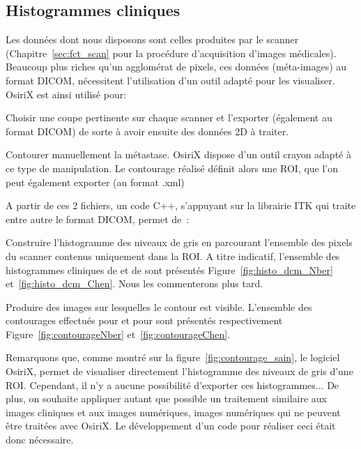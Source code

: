 \documentclass[main.tex]{subfiles}
\begin{document}
\subsection{Histogrammes cliniques}
Les données dont nous disposons sont celles produites par le scanner (\cf Chapitre~\ref{sec:fct_scan} pour la procédure d'acquisition d'images médicales). Beaucoup plus riches qu'un agglomérat de pixels, ces données (méta-images) au format DICOM, nécessitent l'utilisation d'un outil adapté pour les visualiser. OsiriX est ainsi utilisé pour:
\begin{myitemize}
\item Choisir une coupe pertinente sur chaque scanner et l'exporter (également au format DICOM) de sorte à avoir ensuite des données 2D à traiter.
\item Contourer manuellement la métastase. OsiriX dispose d'un outil crayon adapté à ce type de manipulation. Le contourage réalisé définit alors une ROI, que l'on peut également exporter (au format .xml)
\end{myitemize}
A partir de ces 2 fichiers, un code C++, s'appuyant sur la librairie ITK qui traite entre autre le format DICOM, permet de~:
\begin{myitemize}
\item Construire l'histogramme des niveaux de gris en parcourant  l'ensemble des pixels du scanner contenus uniquement dans la ROI. 
A titre indicatif, l'ensemble des histogrammes cliniques de \Nber et de \Chen sont présentés Figure~\ref{fig:histo_dcm_Nber} et~\ref{fig:histo_dcm_Chen}. Nous les commenterons plus tard.
\item Produire des images sur lesquelles le contour est visible. L'ensemble des contourages effectués pour \Nber et pour \Chen sont présentés respectivement Figure~\ref{fig:contourageNber} et~\ref{fig:contourageChen}.
\end{myitemize}


Remarquons que, comme montré sur la figure~\ref{fig:contourage_sain}, le logiciel OsiriX, permet de visualiser directement l'histogramme des niveaux de gris d'une ROI. Cependant, il n'y a aucune possibilité d'exporter ces histogrammes... De plus, on souhaite appliquer autant que possible un traitement similaire aux images cliniques et aux images numériques, images numériques qui ne peuvent être traitées avec OsiriX. Le développement d'un code pour réaliser ceci était donc nécessaire.
\end{document}
